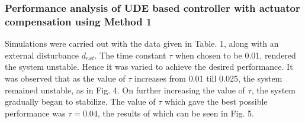 \documentclass[conference]{IEEEtran}
\begin{document}
\subsubsection{Performance analysis of UDE based controller with actuator compensation using Method 1}
Simulations were carried out with the data given in Table. 1, along with an external disturbance $d_{ext}$. The time constant $\tau$ when chosen to be 0.01, rendered the system unstable. Hence it was varied to achieve the desired performance. It was observed that as the value of $\tau$ increases from 0.01 till 0.025, the system remained unstable, as in Fig. 4. On further increasing the value of $\tau$, the system gradually began to stabilize. The value of $\tau$ which gave the best possible performance was $\tau = 0.04$, the results of which can be seen in Fig. 5.
\end{document}
